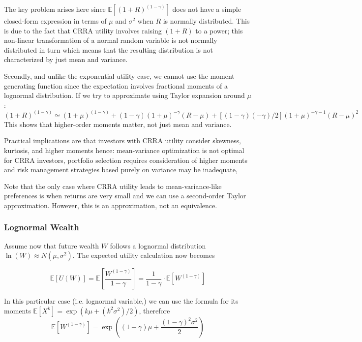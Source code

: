 The key problem arises here since $\mathbb{E}[(1 + R)^(1-\gamma)]$ does not have a simple closed-form expression in terms of $\mu$ and $\sigma^2$ when $R$ is normally distributed. This is due to the fact that CRRA utility involves raising $(1 + R)$ to a power; this non-linear transformation of a normal random variable is not normally distributed in turn which means that the resulting distribution is not characterized by just mean and variance.

Secondly, and unlike the exponential utility case, we cannot use the moment generating function since the expectation involves fractional moments of a lognormal distribution. If we try to approximate using Taylor expansion around $\mu$:
\begin{equation*}
(1 + R)^{(1-\gamma)} \simeq (1 + \mu)^{(1-\gamma)} + (1-\gamma)(1 + \mu)^{-\gamma}(R-\mu) + [(1-\gamma)(-\gamma)/2](1 + \mu)^{-\gamma-1}(R-\mu)^2
\end{equation*}
This shows that higher-order moments matter, not just mean and variance.

Practical implications are that investors with CRRA utility consider skewness, kurtosis, and higher moments hence: mean-variance optimization is not optimal for CRRA investors, portfolio selection requires consideration of higher moments and risk management strategies based purely on variance may be inadequate,

Note that the only case where CRRA utility leads to mean-variance-like preferences is when returns are very small and we can use a second-order Taylor approximation. However, this is an approximation, not an equivalence.

\subsubsection{Lognormal Wealth}

Assume now that future wealth $W$ follows a lognormal distribution $\ln(W)\approx N(\mu,\sigma^2)$. The expected utility calculation now becomes

\begin{equation*}
\mathbb{E}[U(W)] = \mathbb{E}\left[\frac{W^{(1-\gamma)}}{1-\gamma}\right] = \frac{1}{1-\gamma} \cdot \mathbb{E}[W^{(1-\gamma)}]
\end{equation*}

In this particular case (i.e. lognormal variable,) we can use the formula for its moments $\mathbb{E}[X^k]=\exp(k\mu+(k^2\sigma^2)/2)$, therefore
\begin{equation*}
\mathbb{E}[W^{(1-\gamma)}] = \exp\left((1-\gamma)\mu + \frac{(1-\gamma)^2\sigma^2}{2}\right)
\end{equation*}

